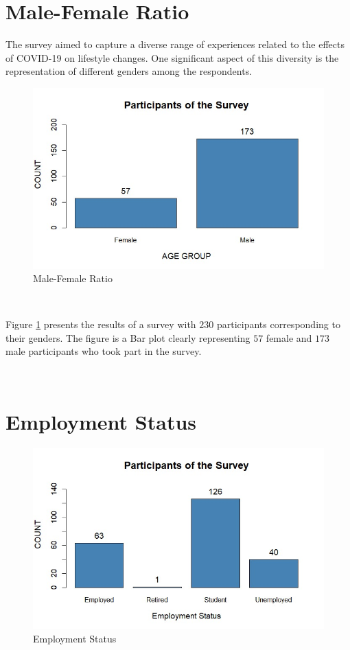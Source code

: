 \section{Male-Female Ratio}

The survey aimed to capture a diverse range of experiences related to the effects of COVID-19 on lifestyle changes. One significant aspect of this diversity is the representation of different genders among the respondents.

\begin{figure}[h!]
	\centering
	\includegraphics[width=0.7\linewidth]{IMAGES/Image 1.jpg}
	\caption{Male-Female Ratio}
	\label{G1}
\end{figure}

\

Figure \ref{G1} presents the results of a survey with $230$ participants corresponding to their genders. The figure is a Bar plot clearly representing $57$ female and $173$ male participants who took part in the survey.

\ 

\section{Employment Status}

\begin{figure}[h!]
	\centering
	\includegraphics[width=0.75\linewidth]{IMAGES/Image 2.jpg}
	\caption{Employment Status}
	\label{G2}
\end{figure}

